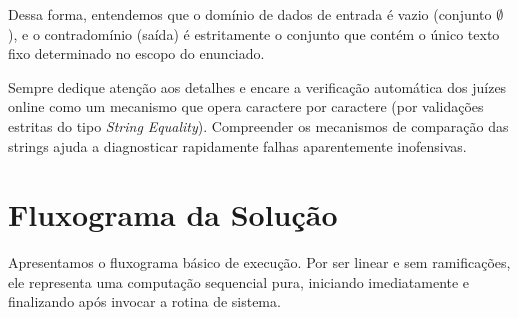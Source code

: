 \documentclass{article}
\begin{document}
Dessa forma, entendemos que o domínio de dados de entrada é vazio (conjunto $\emptyset$), e o contradomínio (saída) é estritamente o conjunto que contém o único texto fixo determinado no escopo do enunciado. 

\begin{successbox}
Sempre dedique atenção aos detalhes e encare a verificação automática dos juízes online como um mecanismo que opera caractere por caractere (por validações estritas do tipo \textit{String Equality}). Compreender os mecanismos de comparação das strings ajuda a diagnosticar rapidamente falhas aparentemente inofensivas.
\end{successbox}

\vspace{1cm}

\section*{Fluxograma da Solução}

Apresentamos o fluxograma básico de execução. Por ser linear e sem ramificações, ele representa uma computação sequencial pura, iniciando imediatamente e finalizando após invocar a rotina de sistema.

\vspace{0.5cm}

\begin{center}
\end{center}
\end{document}
